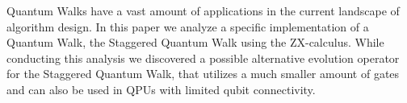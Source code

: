 Quantum Walks have a vast amount of applications in the current landscape of algorithm design. In this paper we analyze a specific implementation of a Quantum Walk, the Staggered Quantum Walk using the ZX-calculus. While conducting this analysis we discovered a possible alternative evolution operator for the Staggered Quantum Walk, that utilizes a much smaller amount of gates and can also be used in QPUs with limited qubit connectivity.